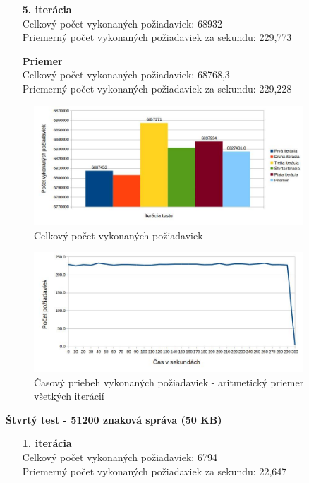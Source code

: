\documentclass[12pt,oneside,final]{fithesis-utf8}
\begin{document}
\begin{itemize}
\begin{itemize}
\item[\textbf{5. iterácia}]\ \\
Celkový počet vykonaných požiadaviek: 68932\\
Priemerný počet vykonaných požiadaviek za sekundu: 229,773

\item[\textbf{Priemer}]\ \\
Celkový počet vykonaných požiadaviek: 68768,3\\
Priemerný počet vykonaných požiadaviek za sekundu: 229,228

\end{itemize}

\begin{figure}[H]
  \centering
      \includegraphics[width=0.9\textwidth]{faban3_3.jpg}
  \caption{Celkový počet vykonaných požiadaviek}
\end{figure}

\begin{figure}[H]
  \centering
      \includegraphics[width=0.9\textwidth]{faban3_3_distr.jpg}
  \caption{Časový priebeh vykonaných požiadaviek - aritmetický priemer všetkých iterácií}
\end{figure}

\textbf{Štvrtý test - 51200 znaková správa (50 KB)}
\begin{itemize}

\item[\textbf{1. iterácia}]\ \\
Celkový počet vykonaných požiadaviek: 6794\\
Priemerný počet vykonaných požiadaviek za sekundu: 22,647


\end{itemize}
\end{itemize}
\end{document}
